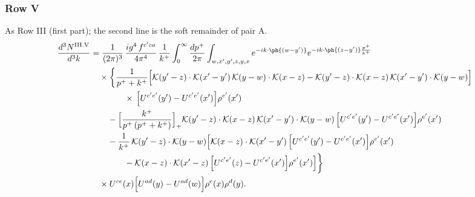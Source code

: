 \subsubsection*{Row V}
As Row III (first part); the second line is the soft remainder of pair A.
\begin{align}
\frac{d^{3}N^{\rm III.V}}{d^{3}k} & =\frac{1}{(2\pi)^{3}}\,\frac{ig^{4}\,f^{c'ca}}{4\pi^{4}}\,\frac{1}{k^{+}}\int_{0}^{\infty}\frac{dp^{+}}{2\pi}\int_{w,x',y',z,y,x}e^{-ik\cdot\ph{(w-y')}}e^{-ik\cdot\ph{(z-y')}\frac{p^{+}}{k^{+}}}\notag\\
&\quad\times\bigg\{\frac{1}{p^{+}+k^{+}}\Big[\mathcal{K}(y'-z)\cdot\mathcal{K}(x'-y')\,\mathcal{K}(y-w)\cdot\mathcal{K}(x-z)-\mathcal{K}(y'-z)\cdot\mathcal{K}(x-z)\,\mathcal{K}(x'-y')\cdot\mathcal{K}(y-w)\Big]\notag\\
&\qquad\qquad\times\,\Big[U^{c'e'}(y')-U^{c'e'}(x')\Big]\rho^{e'}(x')\notag\\
&\qquad-\Big[\frac{k^{+}}{p^{+}\,(p^{+}+k^{+})}\Big]_{+}\mathcal{K}(y'-z)\cdot\mathcal{K}(x-z)\,\mathcal{K}(x'-y')\cdot\mathcal{K}(y-w)\,\Big[U^{c'e'}(y')-U^{c'e'}(x')\Big]\rho^{e'}(x')\notag\\
&\qquad-\frac{1}{k^{+}}\,\mathcal{K}(y'-z)\cdot\mathcal{K}(y-w)\Big[\mathcal{K}(x-z)\cdot\mathcal{K}(x'-y')\,\Big[U^{c'e'}(y')-U^{c'e'}(x')\Big]\rho^{e'}(x')\notag\\
&\qquad\qquad-\mathcal{K}(x-z)\cdot\mathcal{K}(x'-z)\,\Big[U^{c'e'}(z)-U^{c'e'}(x')\Big]\rho^{e'}(x')\Big]\bigg\}\notag\\
&\quad\times U^{ce}(x)\Big[U^{ad}(y)-U^{ad}(w)\Big]\rho^{e}(x)\rho^{d}(y).\label{eq:B-III5}
\end{align}
